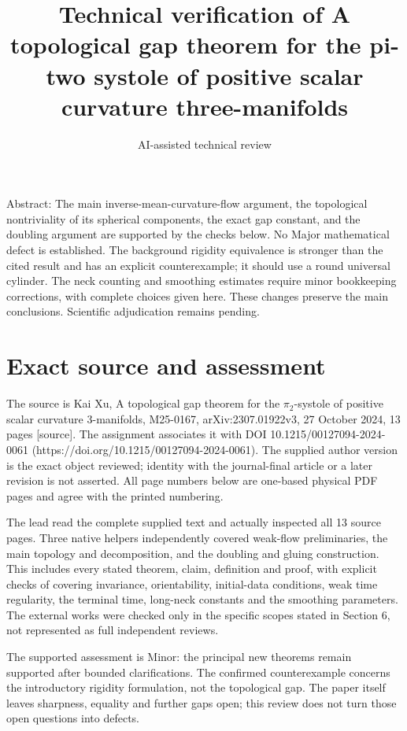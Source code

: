 \documentclass[10pt]{article}
\title{Technical verification of A topological gap theorem for the pi-two systole of positive scalar curvature three-manifolds}
\author{AI-assisted technical review}
\date{}
\begin{document}
\maketitle
Abstract: The main inverse-mean-curvature-flow argument, the topological nontriviality of its spherical components, the exact gap constant, and the doubling argument are supported by the checks below. No Major mathematical defect is established. The background rigidity equivalence is stronger than the cited result and has an explicit counterexample; it should use a round universal cylinder. The neck counting and smoothing estimates require minor bookkeeping corrections, with complete choices given here. These changes preserve the main conclusions. Scientific adjudication remains pending.\par
\section*{Exact source and assessment}
The source is Kai Xu, A topological gap theorem for the \(\pi_2\)-systole of positive scalar curvature 3-manifolds, M25-0167, arXiv:2307.01922v3, 27 October 2024, 13 pages [source]. The assignment associates it with DOI 10.1215/00127094-2024-0061 (https://doi.org/10.1215/00127094-2024-0061). The supplied author version is the exact object reviewed; identity with the journal-final article or a later revision is not asserted. All page numbers below are one-based physical PDF pages and agree with the printed numbering.\par
The lead read the complete supplied text and actually inspected all 13 source pages. Three native helpers independently covered weak-flow preliminaries, the main topology and decomposition, and the doubling and gluing construction. This includes every stated theorem, claim, definition and proof, with explicit checks of covering invariance, orientability, initial-data conditions, weak time regularity, the terminal time, long-neck constants and the smoothing parameters. The external works were checked only in the specific scopes stated in Section 6, not represented as full independent reviews.\par
The supported assessment is Minor: the principal new theorems remain supported after bounded clarifications. The confirmed counterexample concerns the introductory rigidity formulation, not the topological gap. The paper itself leaves sharpness, equality and further gaps open; this review does not turn those open questions into defects.\par
\end{document}
